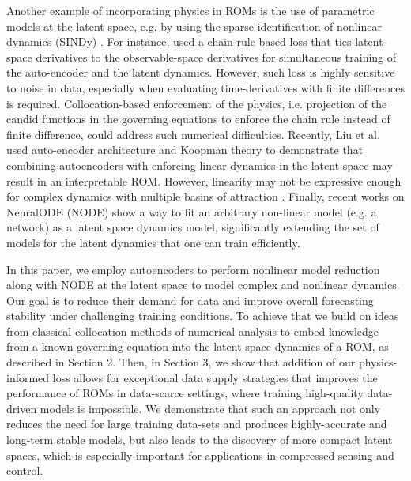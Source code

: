         Another example of incorporating physics in ROMs is the use of parametric models at the latent space, e.g. by using the sparse identification of nonlinear dynamics (SINDy) \cite{brunton2016discovering,champion2019data}. For instance, \cite{fries2022lasdi,he2022glasdi} used a chain-rule based loss that ties latent-space derivatives to the observable-space derivatives for simultaneous training of the auto-encoder and the latent dynamics. However, such loss is highly sensitive to noise in data, especially when evaluating time-derivatives with finite differences is required\cite{delahunt2022sindynoise}. 
        Collocation-based enforcement of the physics, i.e. projection of the candid functions in the governing equations to enforce the chain rule instead of finite difference, could address such numerical difficulties. Recently, Liu et al. \cite{liu2022physics} used auto-encoder architecture and Koopman theory to demonstrate that combining autoencoders with enforcing linear dynamics in the latent space may result in an interpretable ROM. However, linearity may not be expressive enough for complex dynamics with multiple basins of attraction \cite{page2019koopman}.
        Finally, recent works on NeuralODE (NODE) \cite{chen2018neuralode,rackauckas2020udes} show a way to fit an arbitrary non-linear model (e.g. a network) as a latent space dynamics model, significantly extending the set of models for the latent dynamics that one can train efficiently. 
        
        In this paper, we employ autoencoders to perform nonlinear model reduction along with NODE at the latent space to model complex and nonlinear dynamics. Our goal is to reduce their demand for data and improve overall forecasting stability under challenging training conditions. To achieve that we build on ideas from classical collocation methods of numerical analysis to embed knowledge from a known governing equation into the latent-space dynamics of a ROM, as described in Section 2. Then, in Section 3, we show that addition of our physics-informed loss allows for exceptional data supply strategies that improves the performance of ROMs in data-scarce settings, where training high-quality data-driven models is impossible. We demonstrate that such an approach not only reduces the need for large training data-sets and produces highly-accurate and long-term stable models, but also leads to the discovery of more compact latent spaces, which is especially important for applications in compressed sensing and control.
        
